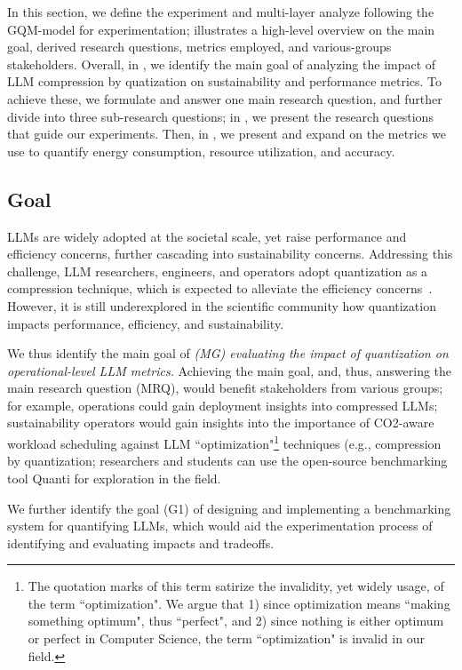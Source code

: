 In this section, we define the experiment and multi-layer analyze following the GQM-model for experimentation;  illustrates a high-level overview on the main goal, derived research questions, metrics employed, and various-groups stakeholders. Overall, in , we identify the main goal of analyzing the impact of LLM compression by quatization on sustainability and performance metrics. To achieve these, we formulate and answer one main research question, and further divide into three sub-research questions; in , we present the research questions that guide our experiments. Then, in , we present and expand on the metrics we use to quantify energy consumption, resource utilization, and accuracy.

\subsection{Goal}\label{sec:experiment:goal}
LLMs are widely adopted at the societal scale, yet raise performance and efficiency concerns, further cascading into sustainability concerns. Addressing this challenge, LLM researchers, engineers, and operators adopt quantization as a compression technique, which is expected to alleviate the efficiency concerns~\cite{zhang2023dual, DBLP:conf/icml/NagelABLB20}. However, it is still underexplored in the scientific community how quantization impacts performance, efficiency, and sustainability. 

We thus identify the main goal of 
\textit{(MG) evaluating the impact of quantization on operational-level LLM metrics.} Achieving the main goal, and, thus, answering the main research question (MRQ), would benefit stakeholders from various groups; for example, operations could gain deployment insights into compressed LLMs; sustainability operators would gain insights into the importance of CO2-aware workload scheduling against LLM ``optimization"\footnote{The quotation marks of this term satirize the invalidity, yet widely usage, of the term ``optimization". We argue that 1) since optimization means ``making something optimum", thus ``perfect", and 2) since nothing is either optimum or perfect in Computer Science, the term ``optimization" is invalid in our field.} techniques (e.g., compression by quantization; researchers and students can use the open-source benchmarking tool Quanti for exploration in the field.

We further identify the goal 
(G1) of designing and implementing a benchmarking system for quantifying LLMs, which would aid the experimentation process of identifying and evaluating impacts and tradeoffs.

